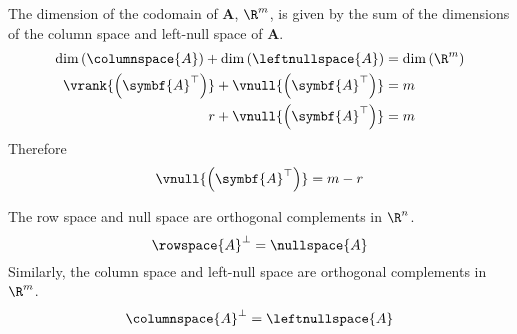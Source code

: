 \documentclass{article}
\begin{document}
\begin{corollary}
    The dimension of the codomain of \(\symbf{A}\), \(\R^m\), is given by
    the sum of the dimensions of the column space and left-null space of \(\symbf{A}\).
    \begin{align*}
        \dim{\left( \columnspace{A} \right)} + \dim{\left( \leftnullspace{A} \right)} & = \dim{\left( \R^m \right)} \\
        \vrank{\left( \symbf{A}^\top \right)} + \vnull{\left( \symbf{A}^\top \right)} & = m                         \\
        r + \vnull{\left( \symbf{A}^\top \right)}                                     & = m
    \end{align*}
    Therefore
    \begin{equation*}
        \vnull{\left( \symbf{A}^\top \right)} = m - r
    \end{equation*}
\end{corollary}
\begin{theorem}
    The row space and null space are orthogonal complements in \(\R^n\).
    \begin{equation*}
        \rowspace{A}^\perp = \nullspace{A}
    \end{equation*}
    Similarly, the column space and left-null space are orthogonal complements in \(\R^m\).
    \begin{equation*}
        \columnspace{A}^\perp = \leftnullspace{A}
    \end{equation*}
\end{theorem}
\end{document}
